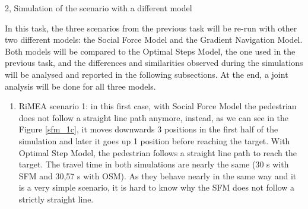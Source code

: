 \documentclass[10pt,a4paper]{article}
\begin{document}
\begin{task}{2, Simulation of the scenario with a different model}

In this task, the three scenarios from the previous task will be re-run with other two different models: the Social Force Model and the Gradient Navigation Model. Both models will be compared to the Optimal Steps Model, the one used in the previous task, and the differences and similarities observed during the simulations will be analysed and reported in the following subsections. At the end, a joint analysis will be done for all three models.

\bigskip


\begin{enumerate}[label=(\alph*)]
    \item RiMEA scenario 1: in this first case, with Social Force Model the pedestrian does not follow a straight line path anymore, instead, as we can see in the Figure \ref{sfm_1c}, it moves downwards 3 positions in the first half of the simulation and later it goes up 1 position before reaching the target. With Optimal Step Model, the pedestrian follows a straight line path to reach the target. The travel time in both simulations are nearly the same (30 s with SFM and 30,57 s with OSM). As they behave nearly in the same way and it is a very simple scenario, it is hard to know why the SFM does not follow a strictly  
    straight line.
    

\end{enumerate}
\end{task}
\end{document}
